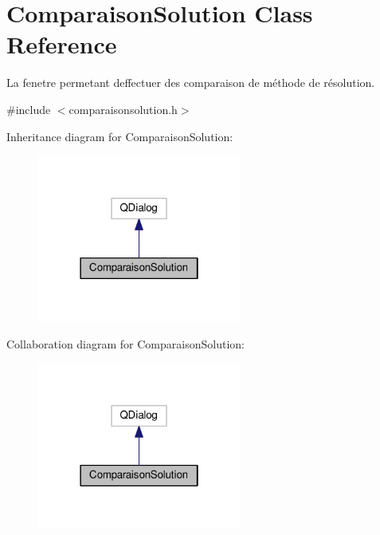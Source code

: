\hypertarget{classComparaisonSolution}{}\section{Comparaison\+Solution Class Reference}
\label{classComparaisonSolution}


La fenetre permetant d\textquotesingle{}effectuer des comparaison de méthode de résolution.  




{\ttfamily \#include $<$comparaisonsolution.\+h$>$}



Inheritance diagram for Comparaison\+Solution\+:\nopagebreak
\begin{figure}[H]
\begin{center}
\leavevmode
\includegraphics[width=190pt]{classComparaisonSolution__inherit__graph}
\end{center}
\end{figure}


Collaboration diagram for Comparaison\+Solution\+:\nopagebreak
\begin{figure}[H]
\begin{center}
\leavevmode
\includegraphics[width=190pt]{classComparaisonSolution__coll__graph}
\end{center}
\end{figure}
